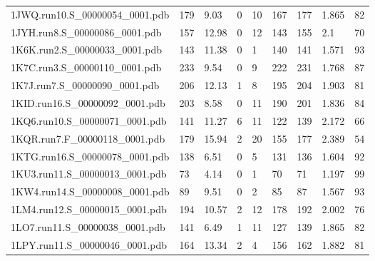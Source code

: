 \documentclass{bioinfo}
\begin{document}
\begin{table*}[!t]
{\begin{tabular}{lllllllll}
    1JWQ.run10.S\_00000054\_0001.pdb & 179      & 9.03       & 0           & 10          & 167         & 177     & 1.865           & 82           \\
    1JYH.run8.S\_00000086\_0001.pdb & 157      & 12.98      & 0           & 12          & 143         & 155     & 2.1             & 70           \\
    1K6K.run2.S\_00000033\_0001.pdb & 143      & 11.38      & 0           & 1           & 140         & 141     & 1.571           & 93           \\
    1K7C.run3.S\_00000110\_0001.pdb & 233      & 9.54       & 0           & 9           & 222         & 231     & 1.768           & 87           \\
    1K7J.run7.S\_00000090\_0001.pdb & 206      & 12.13      & 1           & 8           & 195         & 204     & 1.903           & 81           \\
    1KID.run16.S\_00000092\_0001.pdb & 203      & 8.58       & 0           & 11          & 190         & 201     & 1.836           & 84           \\
    1KQ6.run10.S\_00000071\_0001.pdb & 141      & 11.27      & 6           & 11          & 122         & 139     & 2.172           & 66           \\
    1KQR.run7.F\_00000118\_0001.pdb & 179      & 15.94      & 2           & 20          & 155         & 177     & 2.389           & 54           \\
    1KTG.run16.S\_00000078\_0001.pdb & 138      & 6.51       & 0           & 5           & 131         & 136     & 1.604           & 92           \\
    1KU3.run11.S\_00000013\_0001.pdb & 73       & 4.14       & 0           & 1           & 70          & 71      & 1.197           & 99           \\
    1KW4.run14.S\_00000008\_0001.pdb & 89       & 9.51       & 0           & 2           & 85          & 87      & 1.567           & 93           \\
    1LM4.run12.S\_00000015\_0001.pdb & 194      & 10.57      & 2           & 12          & 178         & 192     & 2.002           & 76           \\
    1LO7.run11.S\_00000038\_0001.pdb & 141      & 6.49       & 1           & 11          & 127         & 139     & 1.865           & 82           \\
    1LPY.run11.S\_00000046\_0001.pdb & 164      & 13.34      & 2           & 4           & 156         & 162     & 1.882           & 81           \\

\end{tabular}}
\end{table*}
\end{document}
